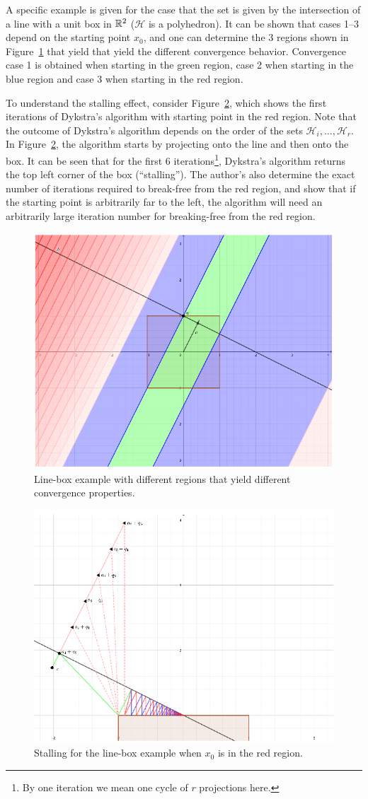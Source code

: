 \documentclass[hidelinks]{article}
\begin{document}
A specific example is given for the case that the set is given by the intersection of a line with a unit box in $\mathbb{R}^2$ ($\mathcal{H}$ is a polyhedron). It can be shown that cases 1--3 depend on the starting point $x_0$, and one can determine the 3 regions shown in Figure~\ref{fig:region} that yield that yield the different convergence behavior. Convergence case 1 is obtained when starting in the green region, case 2 when starting in the blue region and case 3 when starting in the red region.

To understand the stalling effect, consider Figure~\ref{fig:stalling}, which shows the first iterations of Dykstra's algorithm with starting point in the red region. Note that the outcome of Dykstra's algorithm depends on the order of the sets $\mathcal{H}_i,\dots,\mathcal{H}_r$. In Figure~\ref{fig:stalling}, the algorithm starts by projecting onto the line and then onto the box. It can be seen that for the first 6 iterations\footnote{By one iteration we mean one cycle of $r$ projections here.}, Dykstra's algorithm returns the top left corner of the box (``stalling''). The author's also determine the exact number of iterations required to break-free from the red region, and show that if the starting point is arbitrarily far to the left, the algorithm will need an arbitrarily large iteration number for breaking-free from the red region.
%
\begin{figure}
\includegraphics[width=0.6\linewidth]{regions.png}\caption{Line-box example with different regions that yield different convergence properties.}\label{fig:region}
\end{figure}
%
%
\begin{figure}
\includegraphics[width=0.6\linewidth]{stalling.png}\caption{Stalling for the line-box example when $x_0$ is in the red region.}\label{fig:stalling}
\end{figure}
%
\end{document}

